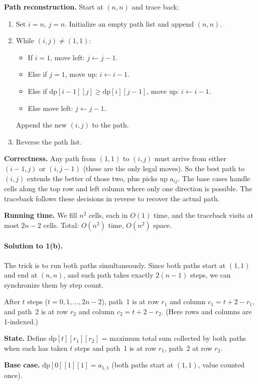 \documentclass[10pt]{article}
\begin{document}
\textbf{Path reconstruction.}  Start at $(n,n)$ and trace back:
\begin{enumerate}
\item Set $i = n$, $j = n$.  Initialize an empty path list and append $(n,n)$.
\item While $(i,j) \neq (1,1)$:
\begin{itemize}
    \item If $i = 1$, move left: $j \leftarrow j-1$.
    \item Else if $j = 1$, move up: $i \leftarrow i-1$.
    \item Else if $\text{dp}[i-1][j] \geq \text{dp}[i][j-1]$, move up: $i \leftarrow i-1$.
    \item Else move left: $j \leftarrow j-1$.
\end{itemize}
Append the new $(i,j)$ to the path.
\item Reverse the path list.
\end{enumerate}

\textbf{Correctness.}  Any path from $(1,1)$ to $(i,j)$ must arrive from either $(i-1,j)$ or $(i,j-1)$ (these are the only legal moves).  So the best path to $(i,j)$ extends the better of those two, plus picks up $a_{ij}$.  The base cases handle cells along the top row and left column where only one direction is possible.  The traceback follows these decisions in reverse to recover the actual path.

\textbf{Running time.}  We fill $n^2$ cells, each in $O(1)$ time, and the traceback visits at most $2n - 2$ cells.  Total: $O(n^2)$ time, $O(n^2)$ space.

\paragraph{Solution to 1(b).}

The trick is to run both paths simultaneously.  Since both paths start at $(1,1)$ and end at $(n,n)$, and each path takes exactly $2(n-1)$ steps, we can synchronize them by step count.

After $t$ steps ($t = 0, 1, \ldots, 2n-2$), path~1 is at row $r_1$ and column $c_1 = t + 2 - r_1$, and path~2 is at row $r_2$ and column $c_2 = t + 2 - r_2$.  (Here rows and columns are 1-indexed.)

\textbf{State.}  Define $\text{dp}[t][r_1][r_2]$ = maximum total sum collected by both paths when each has taken $t$ steps and path~1 is at row $r_1$, path~2 at row $r_2$.

\textbf{Base case.}  $\text{dp}[0][1][1] = a_{1,1}$ (both paths start at $(1,1)$, value counted once).
\end{document}
